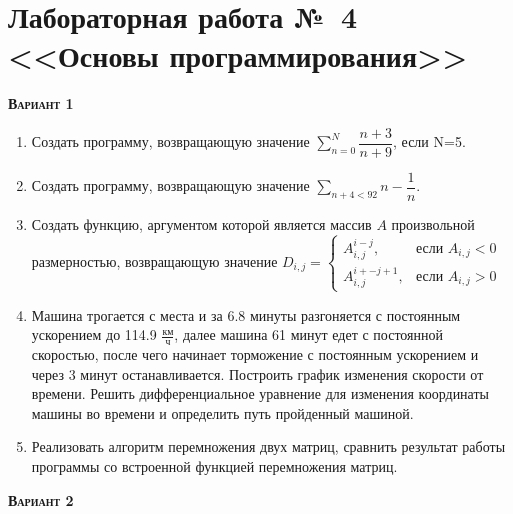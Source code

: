 \section {Лабораторная работа №~4 <<Основы программирования>>}

 \addtocounter{nlab}{1}\textsc{\textbf{Вариант 1}}
\begin{enumerate}
\item  Создать программу, возвращающую значение $\sum\limits_{n=0}^{N} \dfrac{n+3}{n+9}              $, если N=5. 
\item  Создать программу, возвращающую значение $\sum\limits_{n+4<      92} {n -\dfrac{1}{n}}             $. 
\item Создать функцию, аргументом которой является массив $A$ произвольной размерностью, возвращающую значение $D_{i,j}=\begin{cases} A_{i,j}^{i-j}, & \text{если } {A_{i,j}}<0 \\  A_{i,j}^{i+-j+1}, & \text{если } {A_{i,j}}>0 \end{cases}                 $ 
\item Машина трогается с места и за  6.8 минуты разгоняется с постоянным ускорением до 114.9 ${\frac{км}{ч}}$, далее машина   61 минут едет с постоянной скоростью, после чего начинает торможение с постоянным ускорением и через   3 минут останавливается. Построить график изменения скорости от времени. Решить дифференциальное уравнение для изменения координаты машины во времени и определить путь пройденный машиной.  \item Реализовать алгоритм перемножения двух матриц, сравнить результат работы программы со встроенной функцией перемножения матриц.                                                                        

\end{enumerate}
\textsc{\textbf{Вариант 2}}
